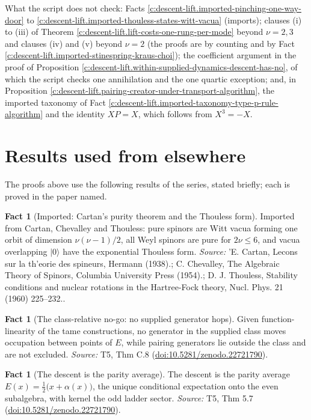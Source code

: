 \documentclass[11pt]{article}
\theoremstyle{definition}
\newtheorem{fact}[theorem]{Fact}
\theoremstyle{plain}
\providecommand{\ket}{}\renewcommand{\ket}[1]{|#1\rangle}
\begin{document}
What the script does not check: Facts \ref{c:descent-lift.imported-pinching-one-way-door} to \ref{c:descent-lift.imported-thouless-states-witt-vacua} (imports); clauses (i) to (iii) of Theorem \ref{c:descent-lift.lift-costs-one-rung-per-mode} beyond $\nu = 2, 3$ and clauses (iv) and (v) beyond $\nu = 2$ (the proofs are by counting and by Fact \ref{c:descent-lift.imported-stinespring-kraus-choi}); the coefficient argument in the proof of Proposition \ref{c:descent-lift.within-supplied-dynamics-descent-has-no}, of which the script checks one annihilation and the one quartic exception; and, in Proposition \ref{c:descent-lift.pairing-creator-under-transport-algorithm}, the imported taxonomy of Fact \ref{c:descent-lift.imported-taxonomy-type-p-rule-algorithm} and the identity $XP = X$, which follows from $X^{3} = -X$.

\section{Results used from elsewhere}
The proofs above use the following results of the series, stated briefly; each is proved in the paper named.

\begin{fact}[Imported: Cartan's purity theorem and the Thouless form]\label{c:one-relation.imported-cartans-purity-theorem-thouless-form}
Imported from Cartan, Chevalley and Thouless: pure spinors are Witt vacua forming one orbit of dimension $\nu(\nu-1)/2$, all Weyl spinors are pure for $2\nu \leq 6$, and vacua overlapping $\ket{0}$ have the exponential Thouless form.
\emph{Source:} 'E. Cartan, Lecons sur la th'eorie des spineurs, Hermann (1938).; C. Chevalley, The Algebraic Theory of Spinors, Columbia University Press (1954).; D. J. Thouless, Stability conditions and nuclear rotations in the Hartree-Fock theory, Nucl. Phys. 21 (1960) 225--232..
\end{fact}

\begin{fact}[The class-relative no-go: no supplied generator hops]\label{c:singularity.class-relative-no-go-no-supplied}
Given function-linearity of the tame constructions, no generator in the supplied class moves occupation between points of $E$, while pairing generators lie outside the class and are not excluded.
\emph{Source:} T5, Thm C.8 (\href{https://doi.org/10.5281/zenodo.22721790}{doi:10.5281/zenodo.22721790}).
\end{fact}

\begin{fact}[The descent is the parity average]\label{c:singularity.descent-parity-average}
The descent is the parity average $E(x) = \tfrac12\bigl(x + \alpha(x)\bigr)$, the unique conditional expectation onto the even subalgebra, with kernel the odd ladder sector.
\emph{Source:} T5, Thm 5.7 (\href{https://doi.org/10.5281/zenodo.22721790}{doi:10.5281/zenodo.22721790}).
\end{fact}
\end{document}

